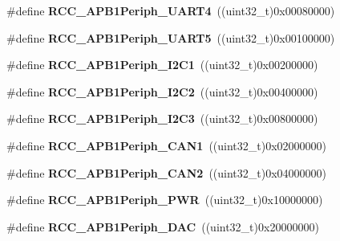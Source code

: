 \begin{DoxyCompactItemize}
\#define {\bfseries R\+C\+C\+\_\+\+A\+P\+B1\+Periph\+\_\+\+U\+A\+R\+T4}~((uint32\+\_\+t)0x00080000)
\item 
\mbox{\label{group___r_c_c___a_p_b1___peripherals_gaa00c73f88a7af45fb29df97b07acd856}} 
\#define {\bfseries R\+C\+C\+\_\+\+A\+P\+B1\+Periph\+\_\+\+U\+A\+R\+T5}~((uint32\+\_\+t)0x00100000)
\item 
\mbox{\label{group___r_c_c___a_p_b1___peripherals_ga594f87d504f7d63697d841033d1538f6}} 
\#define {\bfseries R\+C\+C\+\_\+\+A\+P\+B1\+Periph\+\_\+\+I2\+C1}~((uint32\+\_\+t)0x00200000)
\item 
\mbox{\label{group___r_c_c___a_p_b1___peripherals_ga8eaeded403b5a2277fbfb3896c639416}} 
\#define {\bfseries R\+C\+C\+\_\+\+A\+P\+B1\+Periph\+\_\+\+I2\+C2}~((uint32\+\_\+t)0x00400000)
\item 
\mbox{\label{group___r_c_c___a_p_b1___peripherals_gaec6eadaf773ba87b5ef04b03c62bbac7}} 
\#define {\bfseries R\+C\+C\+\_\+\+A\+P\+B1\+Periph\+\_\+\+I2\+C3}~((uint32\+\_\+t)0x00800000)
\item 
\mbox{\label{group___r_c_c___a_p_b1___peripherals_ga7f1d940739de0134ae89e9e04214989d}} 
\#define {\bfseries R\+C\+C\+\_\+\+A\+P\+B1\+Periph\+\_\+\+C\+A\+N1}~((uint32\+\_\+t)0x02000000)
\item 
\mbox{\label{group___r_c_c___a_p_b1___peripherals_ga62801597b97816751c038acb1466179c}} 
\#define {\bfseries R\+C\+C\+\_\+\+A\+P\+B1\+Periph\+\_\+\+C\+A\+N2}~((uint32\+\_\+t)0x04000000)
\item 
\mbox{\label{group___r_c_c___a_p_b1___peripherals_ga59ae4e17d5b35a934b1614f8ee883834}} 
\#define {\bfseries R\+C\+C\+\_\+\+A\+P\+B1\+Periph\+\_\+\+P\+WR}~((uint32\+\_\+t)0x10000000)
\item 
\mbox{\label{group___r_c_c___a_p_b1___peripherals_ga8d019a727701634822c19371b6aaabb5}} 
\#define {\bfseries R\+C\+C\+\_\+\+A\+P\+B1\+Periph\+\_\+\+D\+AC}~((uint32\+\_\+t)0x20000000)

\end{DoxyCompactItemize}
